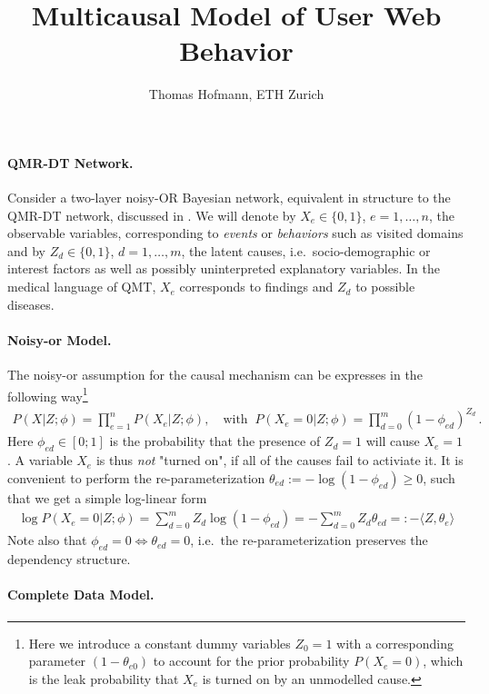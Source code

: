 \documentclass{article}
\title{Multicausal Model of User Web Behavior}
\author{Thomas Hofmann, ETH Zurich}
\begin{document}
\maketitle 

\paragraph{QMR-DT Network.} Consider a two-layer noisy-OR Bayesian network, equivalent in structure to the QMR-DT network, discussed in \cite{shwe1991probabilistic,jaakkola1999variational}. We will denote by $X_e \in \{0,1\}$, $e=1,\dots,n$, the observable variables, corresponding to \textit{events} or \textit{behaviors} such as visited domains and by $Z_d \in \{0,1\}$, $d=1,\dots,m$, the latent causes, i.e.~socio-demographic or interest factors  as well as possibly uninterpreted explanatory variables. In the medical language of QMT, $X_e$ corresponds to findings and $Z_d$ to possible diseases. 

\paragraph{Noisy-or Model.} The noisy-or assumption for the causal mechanism can be expresses in the following way\footnote{Here  we introduce a constant dummy variables $Z_{0}=1$ with a corresponding parameter $(1-\theta_{e0})$ to account for the prior probability $P(X_e=0)$, which is the leak probability that $X_e$ is turned on by an unmodelled cause.}
\begin{align}
P(X|Z; \phi) = \prod_{e=1}^n P(X_e| Z; \phi), \quad \text{with} \;\; P(X _e=0 | Z; \phi) = \prod_{d=0}^m (1-\phi_{ed})^{Z_{d}} \,.
\label{eq:noisy-or}
\end{align}
Here $\phi_{ed} \in [0;1]$ is the probability that the presence of $Z_d=1$ will cause $X_e=1$. A variable $X_e$ is thus \textit{not} "turned on", if all of the causes fail to activiate it. It is convenient to perform the re-parameterization $\theta_{ed} := -\log (1- \phi_{ed}) \ge 0$, such that we get a simple log-linear form
\begin{align}
\log P(X _e=0 | Z; \phi) = \sum_{d=0}^m Z_d \log (1-\phi_{ed}) = -  \sum_{d=0}^m Z_d \theta_{ed} =: - \langle Z, \theta_e \rangle
\label{eq:log-prob} 
\end{align}
Note also that $\phi_{ed}=0 \iff \theta_{ed}=0$, i.e.~the re-parameterization preserves the dependency structure.

\paragraph{Complete Data Model.} 
\end{document}
